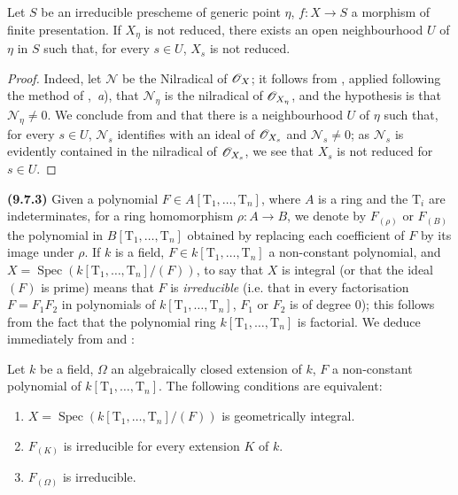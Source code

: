 
\begin{lemma}[9.7.2]
\label{IV.9.7.2}
Let $S$ be an irreducible prescheme of generic point $\eta$, $f:X\to S$ a morphism of finite presentation.
If $X_\eta$ is not reduced, there exists an open neighbourhood $U$ of $\eta$ in $S$ such that, for every $s\in U$, $X_s$ is not reduced.
\end{lemma}

\begin{proof}
Indeed, let $\mathscr{N}$ be the Nilradical of $\mathscr{O}_X$; it follows from , applied following the method of ,~\emph{a}), that $\mathscr{N}_\eta$ is the nilradical of $\mathscr{O}_{X_\eta}$, and the hypothesis is that $\mathscr{N}_\eta\neq 0$.
We conclude from  and  that there is a neighbourhood $U$ of $\eta$ such that, for every $s\in U$, $\mathscr{N}_s$ identifies with an ideal of $\mathscr{O}_{X_s}$ and $\mathscr{N}_s\neq 0$; as $\mathscr{N}_s$ is evidently contained in the nilradical of $\mathscr{O}_{X_s}$, we see that $X_s$ is not reduced for $s\in U$.
\end{proof}

\textbf{(9.7.3)}
Given a polynomial $F\in A[\mathrm{T}_1,\ldots,\mathrm{T}_n]$, where $A$ is a ring and the $\mathrm{T}_i$ are indeterminates, for a ring homomorphism $\rho:A\to B$, we denote by $F_{(\rho)}$ or $F_{(B)}$ the polynomial in $B[\mathrm{T}_1,\ldots,\mathrm{T}_n]$ obtained by replacing each coefficient of $F$ by its image under $\rho$.
If $k$ is a field, $F\in k[\mathrm{T}_1,\ldots,\mathrm{T}_n]$ a non-constant polynomial, and $X=\operatorname{Spec}(k[\mathrm{T}_1,\ldots,\mathrm{T}_n]/(F))$, to say that $X$ is integral (or that the ideal $(F)$ is prime) means that $F$ is \emph{irreducible} (i.e. that in every factorisation $F=F_1 F_2$ in polynomials of $k[\mathrm{T}_1,\ldots,\mathrm{T}_n]$, $F_1$ or $F_2$ is of degree $0$); this follows from the fact that the polynomial ring $k[\mathrm{T}_1,\ldots,\mathrm{T}_n]$ is factorial.
We deduce immediately from  and :

\begin{lemma}[9.7.4]
\label{IV.9.7.4}
Let $k$ be a field, $\Omega$ an algebraically closed extension of $k$, $F$ a non-constant polynomial of $k[\mathrm{T}_1,\ldots,\mathrm{T}_n]$.
The following conditions are equivalent:
\begin{enumerate}[label=\alph*)]
  \item $X=\operatorname{Spec}(k[\mathrm{T}_1,\ldots,\mathrm{T}_n]/(F))$ is geometrically integral.
  \item $F_{(K)}$ is irreducible for every extension $K$ of $k$.
  \item $F_{(\Omega)}$ is irreducible.
\end{enumerate}
\end{lemma}

